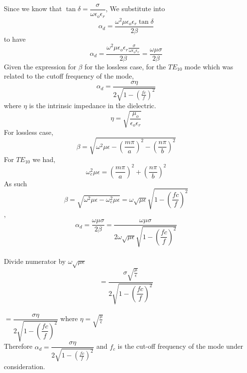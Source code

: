 Since we know that $\tan\delta = \dfrac{\sigma}{\omega\epsilon_{o}\epsilon_{r}}$, We substitute into $$\alpha_{d} = \dfrac{\omega^{2}\mu\epsilon_{o}\epsilon_{r}\tan\delta}{2\beta}$$ to have 
$$
	\alpha_{d} = \dfrac{\omega^{2}\mu\epsilon_{o}\epsilon_{r}\frac{\sigma}{\omega\epsilon_{o}\epsilon_{r}}}{2\beta} = \dfrac{\omega\mu\sigma}{2\beta}
$$
Given the expression for $\beta$ for the lossless case, for the $TE_{10}$ mode which was related to the cutoff frequency of the mode, 
$$
\alpha_{d} =  \frac{\sigma\eta}{2\sqrt{1-(\frac{fc}{f})^{2}}}
$$
where $\eta$ is the intrinsic impedance in the dielectric.
$$	
\eta =  \sqrt{\frac{\mu_{o}}{\epsilon_{o}\epsilon_{r}}}
$$
For lossless case, 
$$\beta = \sqrt{\omega^{2}\mu\epsilon-(\dfrac{m\pi}{a})^{2}-(\dfrac{n\pi}{b})^{2}}$$
For $TE_{10}$ we had, $$\omega^{2}_{c}\mu\epsilon = (\dfrac{m\pi}{a})^{2}+(\dfrac{n\pi}{b})^{2}$$	
As such $$\beta = \sqrt{\omega^{2}\mu\epsilon-\omega^{2}_{c}\mu\epsilon} = \omega\sqrt{\mu\epsilon}\sqrt{1-(\dfrac{fc}{f})^{2}}$$,	
$$\alpha_{d}=\dfrac{\omega\mu\sigma}{2\beta}= \dfrac{\omega\mu\sigma}{2\omega\sqrt{\mu\epsilon}\sqrt{1-(\dfrac{fc}{f})^{2}}}$$\\
Divide numerator by $\omega\sqrt{\mu\epsilon}$
$$= \dfrac{\sigma\sqrt{\frac{\mu}{\epsilon}}}{2\sqrt{1-(\dfrac{fc}{f})^{2}}}$$\\
$=\dfrac{\sigma\eta}{2\sqrt{1 - (\dfrac{fc}{f})^{2}}}$ where $\eta= \sqrt{\frac{\mu}{\epsilon}}$\\
Therefore $\alpha_{d} = \dfrac{\sigma\eta}{2\sqrt{1 -(\frac{fc}{f})^{2}}}$ and $f_c$ is the cut-off frequency of the mode under consideration.

